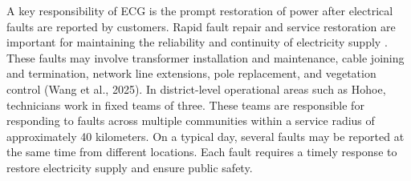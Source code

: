 \documentclass[11pt]{article}
\begin{document}
\vspace{0.25cm}

A key responsibility of ECG is the prompt restoration of power after electrical faults are reported by customers. Rapid fault repair and service restoration are important for maintaining the reliability and continuity of electricity supply \cite{Wang2025}. These faults may involve transformer installation and maintenance, cable joining and termination, network line extensions, pole replacement, and vegetation control (Wang et al., 2025). In district-level operational areas such as Hohoe, technicians work in fixed teams of three. These teams are responsible for responding to faults across multiple communities within a service radius of approximately 40 kilometers. On a typical day, several faults may be reported at the same time from different locations. Each fault requires a timely response to restore electricity supply and ensure public safety.
\end{document}
